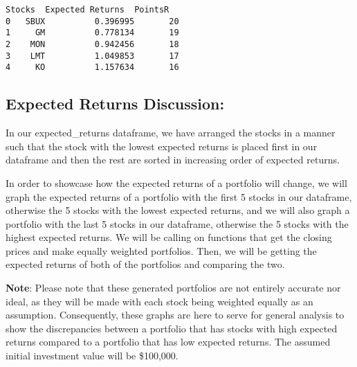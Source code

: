 \documentclass[11pt]{article}
\makeatletter
\newcommand{\boxspacing}{\kern\kvtcb@left@rule\kern\kvtcb@boxsep}
\newcommand{\prompt}[4]{
        {\ttfamily\llap{{\color{#2}[#3]:\hspace{3pt}#4}}\vspace{-\baselineskip}}
    }
\makeatother
\begin{document}
            \begin{tcolorbox}[breakable, size=fbox, boxrule=.5pt, pad at break*=1mm, opacityfill=0]
\prompt{Out}{outcolor}{13}{\boxspacing}
\begin{Verbatim}[commandchars=\\\{\}]
  Stocks  Expected Returns  PointsR
0   SBUX          0.396995       20
1     GM          0.778134       19
2    MON          0.942456       18
3    LMT          1.049853       17
4     KO          1.157634       16
\end{Verbatim}
\end{tcolorbox}
        
    \hypertarget{expected-returns-discussion}{%
\subsection{Expected Returns
Discussion:}\label{expected-returns-discussion}}

In our expected\_returns dataframe, we have arranged the stocks in a
manner such that the stock with the lowest expected returns is placed
first in our dataframe and then the rest are sorted in increasing order
of expected returns.

In order to showcase how the expected returns of a portfolio will
change, we will graph the expected returns of a portfolio with the first
5 stocks in our dataframe, otherwise the 5 stocks with the lowest
expected returns, and we will also graph a portfolio with the last 5
stocks in our dataframe, otherwise the 5 stocks with the highest
expected returns. We will be calling on functions that get the closing
prices and make equally weighted portfolios. Then, we will be getting
the expected returns of both of the portfolios and comparing the two.

\textbf{Note}: Please note that these generated portfolios are not
entirely accurate nor ideal, as they will be made with each stock being
weighted equally as an assumption. Consequently, these graphs are here
to serve for general analysis to show the discrepancies between a
portfolio that has stocks with high expected returns compared to a
portfolio that has low expected returns. The assumed initial investment
value will be \$100,000.
\end{document}
